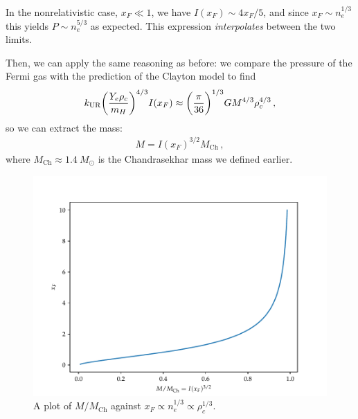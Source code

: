 \documentclass[main.tex]{subfiles}
\begin{document}
In the nonrelativistic case, \(x_F \ll 1\), we have \(I(x_F) \sim 4 x_F / 5\), and since \(x_F \sim n_e^{1/3}\) this yields \(P \sim n_e^{5/3}\) as expected. 
This expression \emph{interpolates} between the two limits.

Then, we can apply the same reasoning as before: we compare the pressure of the Fermi gas with the prediction of the Clayton model to find
%
\begin{align}
k _{\text{UR}} \qty(\frac{Y_e \rho_{c}}{m_H})^{4/3} I(x_F)
\approx \qty(\frac{\pi }{36})^{1/3} G M^{4/3} \rho_{c}^{4/3}
\,,
\end{align}
%
so we can extract the mass: 
%
\begin{align}
M = I(x_F)^{3/2} M _{\text{Ch}}
\,,
\end{align}
%
where \(M _{\text{Ch}} \approx \SI{1.4}{M_{\odot}}\) is the Chandrasekhar mass we defined earlier.

\begin{figure}[ht]
\centering
\includegraphics[width=\textwidth]{figures/chandrasekhar_limit.pdf}
\caption{A plot of \(M / M _{\text{Ch}}\) against \(x_F \propto n_e^{1/3} \propto \rho _c^{1/3}\).}
\label{fig:chandrasekhar}
\end{figure}

\end{document}
